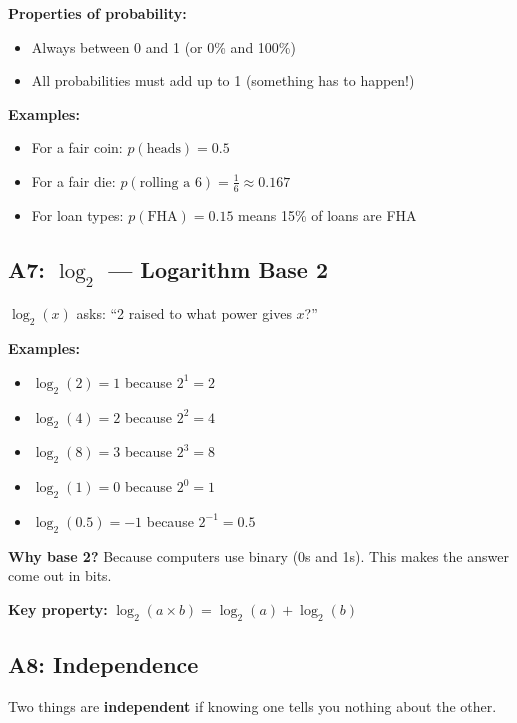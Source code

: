 \documentclass[11pt,a4paper]{article}
\begin{document}
\textbf{Properties of probability:}
\begin{itemize}
    \item Always between 0 and 1 (or 0\% and 100\%)
    \item All probabilities must add up to 1 (something has to happen!)
\end{itemize}

\textbf{Examples:}
\begin{itemize}
    \item For a fair coin: $p(\text{heads}) = 0.5$
    \item For a fair die: $p(\text{rolling a 6}) = \frac{1}{6} \approx 0.167$
    \item For loan types: $p(\text{FHA}) = 0.15$ means 15\% of loans are FHA
\end{itemize}

\subsection*{A7: $\log_2$ --- Logarithm Base 2}
\label{A7}

$\log_2(x)$ asks: ``2 raised to what power gives $x$?''

\textbf{Examples:}
\begin{itemize}
    \item $\log_2(2) = 1$ because $2^1 = 2$
    \item $\log_2(4) = 2$ because $2^2 = 4$
    \item $\log_2(8) = 3$ because $2^3 = 8$
    \item $\log_2(1) = 0$ because $2^0 = 1$
    \item $\log_2(0.5) = -1$ because $2^{-1} = 0.5$
\end{itemize}

\textbf{Why base 2?} Because computers use binary (0s and 1s). This makes the answer come out in bits.

\textbf{Key property:} $\log_2(a \times b) = \log_2(a) + \log_2(b)$

\subsection*{A8: Independence}
\label{A8}

Two things are \textbf{independent} if knowing one tells you nothing about the other.
\end{document}
